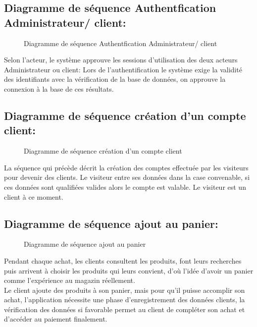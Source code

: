 \documentclass[a4paper]{report}
\begin{document}
\begin{doublespace}
    \subsection{Diagramme de séquence Authentfication
        Administrateur/ client:}
    \begin{figure}[H]
        \begin{center}
            \caption{Diagramme de séquence Authentfication
                Administrateur/ client}
        \end{center}
    \end{figure}
    Selon l'acteur, le système approuve les sessions
    d'utilisation des deux acteurs Administrateur ou client: Lors de
    l'authentification le système exige la validité des identifiants avec la
    vérification de la base de données, on approuve la connexion à la base de ces
    résultats.
    \subsection{Diagramme de séquence création d'un compte
        client:}
    \begin{figure}[H]
        \begin{center}
            \caption{Diagramme de séquence création d'un compte
                client}
        \end{center}
    \end{figure}
    La séquence  qui précède décrit la création des comptes
    effectuée par les visiteurs pour devenir des clients. Le visiteur entre ses
    données dans la case convenable, si ces données sont qualifiées valides alors
    le compte est valable. Le visiteur est un client à ce moment.
    \subsection{Diagramme de séquence ajout au panier:}
    \begin{figure}[H]
        \begin{center}
            \caption{Diagramme de séquence ajout au panier}
        \end{center}
    \end{figure}
    Pendant chaque achat, les clients consultent les produits,
    font leurs recherches puis arrivent à choisir les produits qui leurs convient,
    d'où l'idée d'avoir un panier comme l'expérience au magazin réellement. \\Le
    client ajoute des produits à son panier, mais pour qu'il puisse accomplir son
    achat, l'application nécessite une phase d'enregistrement des données clients,
    la vérification des données si favorable permet au client de compléter son
    achat et d'accéder au paiement finalement.


\end{doublespace}
\end{document}
